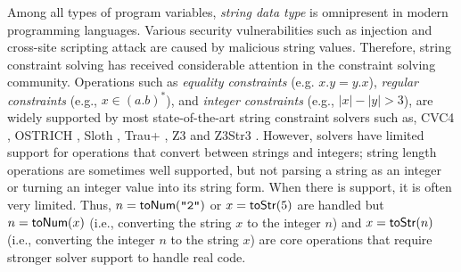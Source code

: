 \documentclass[sigplan,review,anonymous]{acmart}\settopmatter{printfolios=true,printccs=false,printacmref=false}
\begin{document}
Among all types of program variables, \emph{string data type} is omnipresent in modern programming languages. Various security vulnerabilities such as injection and cross-site scripting attack are caused by malicious string values. Therefore, string constraint solving has received considerable attention in the constraint solving community. 
Operations such as \emph{equality constraints} (e.g. $x.y = y.x$), \emph{regular constraints} (e.g., $x \in (a.b)^*$), and \emph{integer constraints} (e.g., $|x|-|y|>3$), are widely supported by most state-of-the-art string constraint solvers such as, CVC4 \cite{?}, OSTRICH \cite{}, Sloth \cite{},  Trau+ \cite{?}, Z3 \cite{?} and Z3Str3 \cite{?}. 
However,  solvers have limited support for operations that convert between strings and integers; string length operations are sometimes well supported, but not parsing a string as an integer or turning an integer value into its string form. When there is support, it is often very limited. Thus, $n = \mbox{\textsf{toNum}($\texttt{"2"}$)}$ or $x = \mbox{\textsf{toStr}($5$)}$ are handled but $n = \mbox{\textsf{toNum}($x$)}$ (i.e., converting the string $x$ to the integer $n$) and $x = \mbox{\textsf{toStr}($n$)}$ (i.e., converting the integer $n$ to the string $x$) are core operations that require stronger solver support to handle real code.














\end{document}
